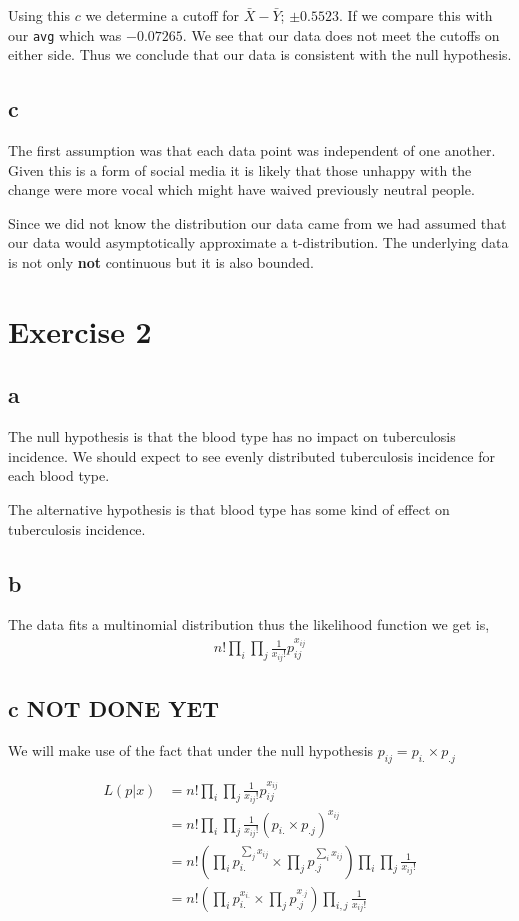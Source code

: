 \documentclass{article}
\begin{document}
Using this $c$ we determine a cutoff for $\bar{X} - \bar{Y}$;
$\pm0.5523$. If we 
compare this with our \texttt{avg} which was $-0.07265$. We see that our data
does not meet the cutoffs on either side. Thus we conclude that our data is
consistent with the null hypothesis.

\subsection{c}
The first assumption was that each data point was independent of one another.
Given this is a form of social media it is likely that those unhappy with the
change were more vocal which might have waived previously neutral people.

Since we did not know the distribution our data came from we had assumed that
our data would asymptotically approximate a t-distribution. The underlying data
is not only \textbf{not} continuous but it is also bounded.

\section{Exercise 2}
\subsection{a}
The null hypothesis is that the blood type has no impact on tuberculosis 
incidence. We should expect to see evenly distributed tuberculosis incidence
for each blood type.

The alternative hypothesis is that blood type has some kind of effect on
tuberculosis incidence.

\subsection{b}
The data fits a multinomial distribution thus the likelihood function we get is,
\begin{align*}
    n! \prod_{i} \prod_{j} \frac{1}{x_{ij}!} p_{ij}^{x_{ij}}
\end{align*}

\subsection{c NOT DONE YET}
We will make use of the fact that under the null hypothesis
$p_{ij} = p_{i.} \times p_{.j}$

\begin{align*}
    L(p|x) &= n! \prod_{i} \prod_{j} \frac{1}{x_{ij}!} p_{ij}^{x_{ij}} \\
    &= n! \prod_{i} \prod_{j} \frac{1}{x_{ij}!} (p_{i.} \times p_{.j})^{x_{ij}} \\
    &= n! \left(\prod_i p_{i.}^{\sum_j x_{ij}} \times \prod_j p_{.j}^{\sum_i x_{ij}}\right)
    \prod_{i} \prod_{j} \frac{1}{x_{ij}!} \\
    &= n! \left(\prod_i p_{i.}^{x_{i.}} \times \prod_j p_{.j}^{x_{.j}}\right)
    \prod_{i,j} \frac{1}{x_{ij}!} 
\end{align*}
\end{document}

